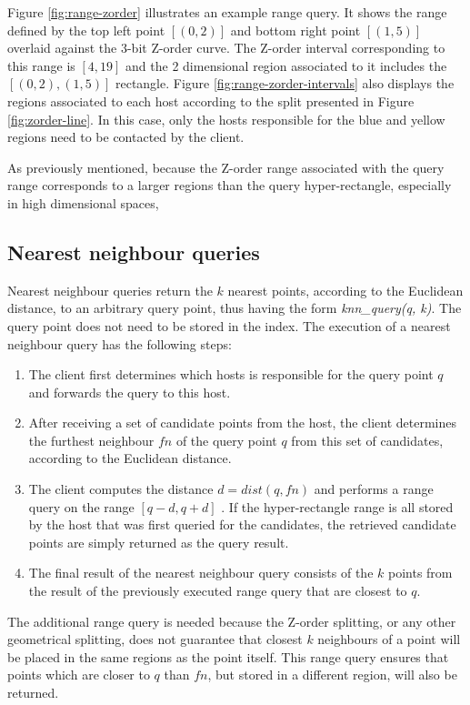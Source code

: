 \documentclass[11pt,a4paper]{globis-book}
\begin{document}
Figure \ref{fig:range-zorder} illustrates an example range query. It shows the range defined by the top left point $[(0, 2)]$ and bottom right point $[(1, 5)]$ overlaid against the 3-bit Z-order curve. The Z-order interval corresponding to this range is $[4, 19]$ and the 2 dimensional region associated to it includes the $[(0, 2), (1, 5)]$ rectangle. Figure \ref{fig:range-zorder-intervals} also displays the regions associated to each host according to the split presented in Figure \ref{fig:zorder-line}. In this case, only the hosts responsible for the blue and yellow regions need to be contacted by the client. 

As previously mentioned, because the Z-order range associated with the query range corresponds to a larger regions than the query hyper-rectangle, especially in high dimensional spaces, 

\subsection{Nearest neighbour queries}

Nearest neighbour queries return the $k$ nearest points, according to the Euclidean distance, to an arbitrary query point, thus having the form \textit{knn\_query(q, k)}. The query point does not need to be stored in the index. The execution of a nearest neighbour query has the following steps:
\begin{enumerate}
    \item The client first determines which hosts is responsible for the query point $q$ and forwards the query to this host.
    \item After receiving a set of candidate points from the host, the client determines the furthest neighbour $fn$ of the query point $q$ from this set of candidates, according to the Euclidean distance. 
    \item The client computes the distance $d = dist(q, fn)$ and performs a range query on the range $[q - d, q + d]$ . If the hyper-rectangle range is all stored by the host that was first queried for the candidates, the retrieved candidate points are simply returned as the query result.
    \item The final result of the nearest neighbour query consists of the $k$ points from the result of the previously executed range query that are closest to $q$.  
\end{enumerate}

The additional range query is needed because the Z-order splitting, or any other geometrical splitting, does not guarantee that closest $k$ neighbours of a point will be placed in the same regions as the point itself. This range query ensures that points which are closer to $q$ than $fn$, but stored in a different region, will also be returned. 
\end{document}
